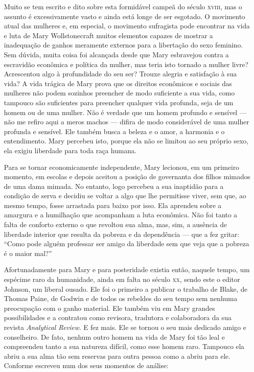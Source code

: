 Muito se tem escrito e dito sobre esta formidável campeã do século \textsc{xviii}, mas o
assunto é excessivamente vasto e ainda está longe de ser esgotado. O movimento
atual das mulheres e, em especial, o movimento sufragista pode encontrar
na vida e luta de Mary Wollstonecraft muitos elementos capazes de
mostrar a inadequação de ganhos meramente externos para a libertação do
sexo feminino. Sem dúvida, muita coisa foi alcançada desde que Mary
esbravejou contra a escravidão econômica e política da mulher, mas teria
isto tornado a mulher livre? Acrescentou algo à profundidade do seu
ser? Trouxe alegria e satisfação à sua vida? A vida trágica de Mary
prova que os direitos econômicos e sociais das mulheres não podem
sozinhos preencher de modo suficiente a sua vida, como tampouco são
suficientes para preencher qualquer vida profunda, seja de um homem ou
de uma mulher. Não é verdade que um homem profundo e sensível --- não me
refiro aqui a meros machos --- difira de modo considerável de uma mulher
profunda e sensível. Ele também busca a beleza e o amor, a harmonia e o
entendimento. Mary percebeu isto, porque ela não se limitou ao seu
próprio sexo, ela exigiu liberdade para toda raça humana.

Para se tornar economicamente independente, Mary lecionou, em um
primeiro momento, em escolas e depois aceitou a posição de governanta
dos filhos mimados de uma dama mimada. No entanto, logo percebeu a sua
inaptidão para a condição de serva e decidiu se voltar a algo que lhe
permitisse viver, sem que, ao mesmo tempo, fosse arrastada para baixo
por isso. Ela aprendeu sobre a amargura e a humilhação que acompanham a
luta econômica. Não foi tanto a falta de conforto externo o que revoltou
sua alma, mas, sim, a ausência de liberdade interior que resulta da
pobreza e da dependência --- que a fez gritar: ``Como pode alguém
professar ser amigo da liberdade sem que veja que a pobreza é o maior
mal?''

Afortunadamente para Mary e para posteridade existia então, naquele
tempo, um espécime raro da humanidade, ainda em falta no século \textsc{xx},
sendo este o editor Johnson, um liberal ousado. Ele foi o primeiro a
publicar o trabalho de Blake, de Thomas Paine, de Godwin e de todos os
rebeldes do seu tempo sem nenhuma preocupação com o ganho material. Ele
também viu em Mary grandes possibilidades e a contratou como revisora,
tradutora e colaboradora da sua revista \textit{Analytical Review.} E fez
mais. Ele se tornou o seu mais dedicado amigo e conselheiro. De fato,
nenhum outro homem na vida de Mary foi tão leal e compreendeu tanto a
sua natureza difícil, como esse homem raro. Tampouco ela abriu a sua
alma tão sem reservas para outra pessoa como a abriu para ele. Conforme
escreveu num dos seus momentos de análise:

